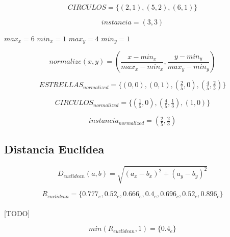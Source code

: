 \documentclass{article}
\begin{document}
		\begin{equation}
		\label{eq:circulos}
			CIRCULOS  = \{(2,1), (5,2), (6,1)\}
		\end{equation}

		\begin{equation}
		\label{eq:instancia}
			instancia  = (3,3)
		\end{equation}

		$max_x = 6$ $min_x = 1$ $max_y = 4$ $min_y = 1$


		\begin{equation}
		\label{eq:normalization}
			normalize(x,y) = (\frac{x-min_x}{max_x-min_x},\frac{y-min_y}{max_y-min_y})
		\end{equation}


		\begin{equation}
		\label{eq:estrellas_normalized}
			ESTRELLAS_{normalized} = \{(0,0), (0,1), (\tfrac{2}{5},0), (\tfrac{4}{5},\tfrac{2}{3})\}
		\end{equation}

		\begin{equation}
		\label{eq:circulos_normalized}
			CIRCULOS_{normalized}  = \{(\tfrac{1}{5},0), (\tfrac{4}{5},\tfrac{1}{3}), (1,0)\}
		\end{equation}

		\begin{equation}
		\label{eq:instancia_normalized}
			instancia_{normalized}  = (\tfrac{2}{5},\tfrac{2}{3})
		\end{equation}

		\subsection{Distancia Euclídea}


			\begin{equation}
				D_{euclidean}(a,b) = \sqrt{(a_x - b_x)^2 + (a_y - b_y)^2}
			\end{equation}

			\begin{equation}
				R_{euclidean} = \{0.777_e, 0.52_e, 0.666_e, 0.4_e, 0.696_c, 0.52_c, 0.896_c\}
			\end{equation}

			\paragraph{}
			[TODO]

			\begin{equation}
				min(R_{euclidean},1) = \{ 0.4_e \}
			\end{equation}
\end{document}
